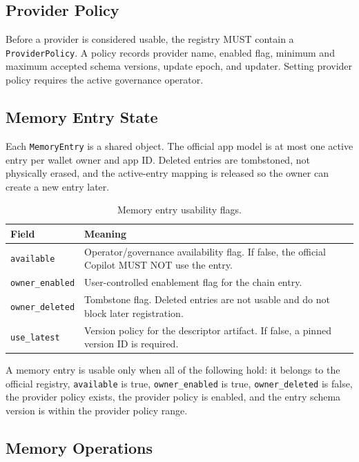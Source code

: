 \documentclass[11pt]{article}
\newcommand{\code}[1]{\texttt{#1}}
\begin{document}
\subsection{Provider Policy}

Before a provider is considered usable, the registry MUST contain a
\code{ProviderPolicy}. A policy records provider name, enabled flag, minimum and
maximum accepted schema versions, update epoch, and updater. Setting provider
policy requires the active governance operator.

\subsection{Memory Entry State}

Each \code{MemoryEntry} is a shared object. The official app model is at most
one active entry per wallet owner and app ID. Deleted entries are tombstoned,
not physically erased, and the active-entry mapping is released so the owner can
create a new entry later.

\begin{table}[htbp]
\centering
\caption{Memory entry usability flags.}
\begin{tabularx}{\textwidth}{p{}X}
\toprule
\textbf{Field} & \textbf{Meaning} \\
\midrule
\code{available} & Operator/governance availability flag. If false, the official Copilot MUST NOT use the entry. \\
\code{owner\_enabled} & User-controlled enablement flag for the chain entry. \\
\code{owner\_deleted} & Tombstone flag. Deleted entries are not usable and do not block later registration. \\
\code{use\_latest} & Version policy for the descriptor artifact. If false, a pinned version ID is required. \\
\bottomrule
\end{tabularx}
\end{table}

A memory entry is usable only when all of the following hold: it belongs to the
official registry, \code{available} is true, \code{owner\_enabled} is true,
\code{owner\_deleted} is false, the provider policy exists, the provider policy
is enabled, and the entry schema version is within the provider policy range.

\subsection{Memory Operations}
\end{document}
